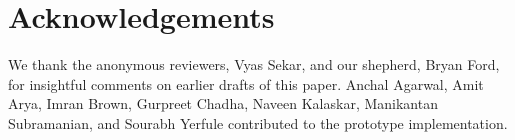 \section*{Acknowledgements}

We thank the anonymous reviewers, Vyas Sekar, and our shepherd, Bryan Ford,
for insightful comments on earlier drafts of this paper.
Anchal Agarwal, Amit Arya, Imran Brown, Gurpreet Chadha, Naveen Kalaskar, Manikantan Subramanian, and Sourabh Yerfule contributed to the \sysname{} prototype implementation.
